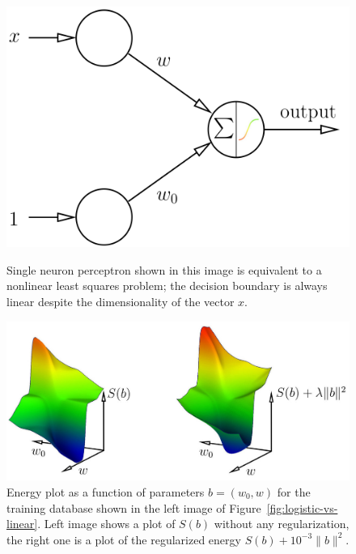 \documentclass[notitlepage,oneside]{book}
\begin{document}
\begin{figure}[!b]
\begin{minipage}{.37\linewidth}
    \includegraphics[width=\linewidth]{img/neuron.png}
    \caption{Single neuron perceptron shown in this image is equivalent to a nonlinear least squares problem; the decision boundary is always linear despite the dimensionality of the vector $x$.}
    \label{fig:neuron1}
\end{minipage}
\hspace{0.02\linewidth}
\begin{minipage}{.6\linewidth}
\vspace{-6mm}\includegraphics[width=\linewidth]{img/ls-vs-crossentropy-energies1.jpg}
    \caption{
    Energy plot as a function of parameters $b= (w_0,w)$ for the training database shown in the left image of Figure~\ref{fig:logistic-vs-linear}.
 Left image shows a plot of $S(b)$ without any regularization, the right one is a plot of the regularized energy $S(b)+ 10^{-3} \|b\|^2$.
    }
    \label{fig:energies}
\end{minipage}
\end{figure}
\end{document}
